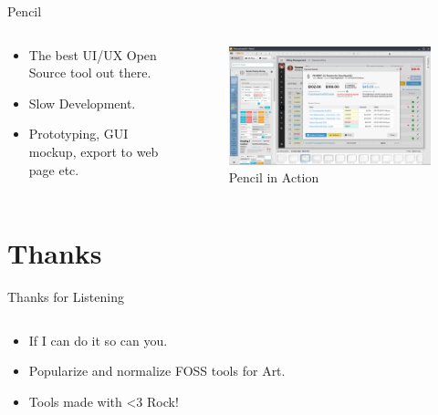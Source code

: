 \documentclass[presentation]{beamer}
\begin{document}
\begin{frame}[label={sec:org48bd4b3}]{Pencil}
\begin{columns}
\begin{column}{0.4\columnwidth}
\begin{itemize}
\item The best UI/UX Open Source tool out there.
\item Slow Development.
\item Prototyping, GUI mockup, export to web page etc.
\end{itemize}
\end{column}
\begin{column}{0.6\columnwidth}
\begin{figure}[htbp]
\centering
\includegraphics[width=.9\linewidth]{./pencil.png}
\caption{Pencil in Action}
\end{figure}
\end{column}
\end{columns}
\end{frame}
\section*{Thanks}
\label{sec:org0be0415}
\begin{frame}[label={sec:org6d27a22}]{Thanks for Listening}
\begin{columns}
\begin{column}{0.6\columnwidth}
\begin{itemize}
\item If I can do it so can you.
\item Popularize and normalize FOSS tools for Art.
\item Tools made with \alert{\alert{<3}} Rock!
\end{itemize}
\end{column}
\end{columns}
\end{frame}
\end{document}
